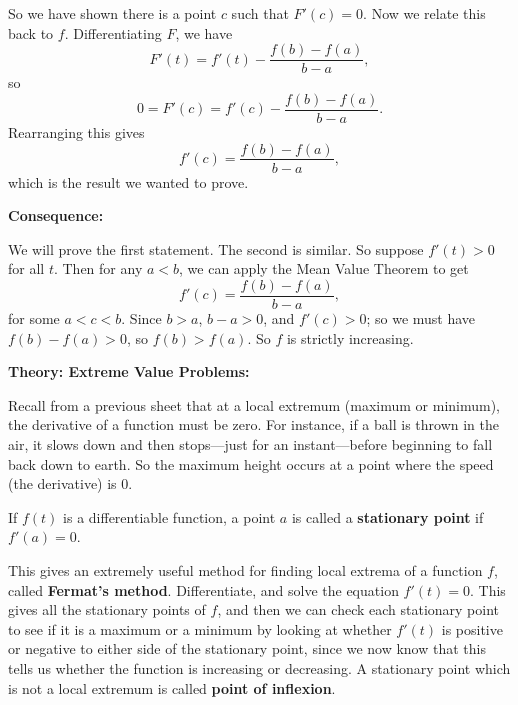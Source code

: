 \documentclass{article}
\begin{document}
So we have shown there is a point $c$ such that $F'(c)=0$. Now we relate this back to $f$. Differentiating $F$, we have
\[F'(t)=f'(t)-\frac{f(b)-f(a)}{b-a},\]
so
\[0=F'(c)=f'(c)-\frac{f(b)-f(a)}{b-a}.\]
Rearranging this gives
\[f'(c)=\frac{f(b)-f(a)}{b-a},\]
which is the result we wanted to prove.


\vfill


\textbf{Consequence:}\bigskip


\noindent{}\bigskip

We will prove the first statement. The second is similar. So suppose $f'(t)>0$ for all $t$. Then for any $a<b$, we can apply the Mean Value Theorem to get
\[f'(c)=\frac{f(b)-f(a)}{b-a},\]
for some $a<c<b$. Since $b>a$, $b-a>0$, and $f'(c)>0$; so we must have $f(b)-f(a)>0$, so $f(b)>f(a)$. So $f$ is strictly increasing.



\clearpage



\textbf{Theory: Extreme Value Problems:}

\vspace{5mm}




Recall from a previous sheet that at a local extremum (maximum or minimum), the derivative of a function must be zero. For instance, if a ball is thrown in the air, it slows down and then stops---just for an instant---before beginning to fall back down to earth. So the maximum height occurs at a point where the speed (the derivative) is 0. 

If $f(t)$ is a differentiable function, a point $a$ is called a \textbf{stationary point} if $f'(a)=0$.\bigskip

\noindent{}\bigskip


This gives an extremely useful method for finding local extrema of a function $f$, called \textbf{Fermat's method}. Differentiate, and solve the equation $f'(t)=0$. This gives all the stationary points of $f$, and then we can check each stationary point to see if it is a maximum or a minimum by looking at whether $f'(t)$ is positive or negative to either side of the stationary point, since we now know that this tells us whether the function is increasing or decreasing. A stationary point which is not a local extremum is called \textbf{point of inflexion}.\bigskip
\end{document}
